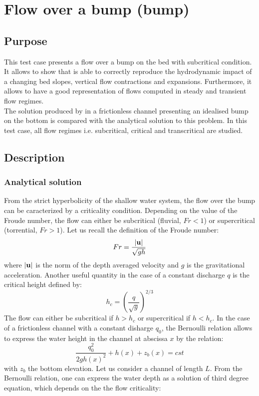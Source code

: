 \chapter{Flow over a bump (bump)}
\label{chapter:bump}

\section{Purpose}

This test case presents a flow over a bump on the bed with subcritical condition.
It allows to show that  is able to correctly reproduce
the hydrodynamic impact of a changing bed slopes, vertical flow
contractions and expansions. Furthermore, it allows to have a good
representation of flows computed in steady and transient flow regimes. \\

The solution produced by  in a frictionless channel
presenting an idealised bump on the bottom  is compared with
the analytical solution to this problem. In this test case,
all flow regimes i.e. subcritical, critical and transcritical are studied.

\section{Description}

\subsection{Analytical solution}

From the strict hyperbolicity of the shallow water system, the flow over the bump can be caracterized by a
criticality condition. Depending on the value of the Froude number,
the flow can either be subcritical (fluvial, $Fr<1$)
or supercritical (torrential, $Fr>1$).
Let us recall the definition of the Froude number:
\begin{equation}
Fr = \dfrac{|{\bf u}|}{\sqrt{gh}}
\end{equation}
where $|{\bf u}|$ is the norm of the depth averaged velocity and $g$ is the gravitational acceleration. Another useful quantity in the case of a constant discharge $q$ is the critical height defined by:
\begin{equation}
h_c = \left( \dfrac{q}{\sqrt{g}}\right)^{2/3}
\end{equation}
The flow can either be subcritical if $h>h_c$ or supercritical if $h<h_c$.
In the case of a frictionless channel with a constant disharge $q_0$, the Bernoulli relation allows to express the water height in the channel at abscissa $x$ by the relation:
\begin{equation}
\dfrac{q_0^2}{2 g h(x)^2} + h(x) + z_b(x) = cst
\end{equation}
with $z_b$ the bottom elevation. Let us consider a channel of length $L$.
From the Bernoulli relation, one can express the water depth as a solution of third degree equation, which depends on the
the flow criticality:

